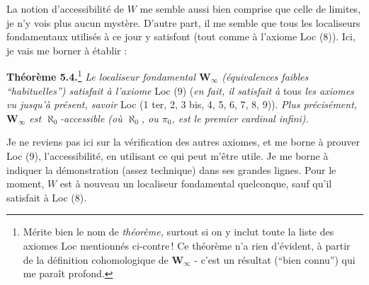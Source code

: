 La notion d'accessibilité de $W$ me semble aussi bien comprise que celle de limites, je n'y vois plus aucun mystère. D'autre part, il me semble que tous les localiseurs fondamentaux utilisés à ce jour y satisfont (tout comme à l'axiome Loc (8)). Ici, je vais me borner à établir :


\textbf{Théorème 5.4.}\footnote[39]{Mérite bien le nom de \textit{théorème,} surtout si on y inclut toute la liste des axiomes Loc mentionnés ci-contre\,! Ce théorème n'a rien d'évident, à partir de la définition cohomologique de $\mathbf{W}_\infty$ - c'est un résultat (``bien connu'') qui me paraît profond.} \textit{Le localiseur fondamental $\mathbf{W}_\infty$ (équivalences faibles ``habituelles'') satisfait à l'axiome} Loc (9) (\textit{en fait, il satisfait à} tous \textit{les axiomes vu jusqu'à présent, savoir} Loc (1 ter, 2, 3 bis, 4, 5, 6, 7, 8, 9)). \textit{Plus précisément, $\mathbf{W}_\infty$ est $\aleph_0$-accessible (où $\aleph_0$, ou $\pi_0$, est le premier cardinal infini).} %

Je ne reviens pas ici sur la vérification des autres axiomes, et me borne à prouver Loc (9), l'accessibilité, en utilisant ce qui peut m'être utile. Je me
borne à indiquer la démonstration (assez technique) dans ses grandes lignes. Pour le moment, $W$ est à nouveau un localiseur fondamental quelconque, sauf qu'il satisfait à Loc (8).

